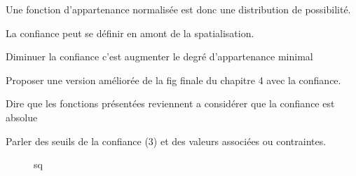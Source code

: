 Une fonction d'appartenance normalisée est donc une distribution de
possibilité.

La confiance peut se définir en amont de la spatialisation.

Diminuer la confiance c'est augmenter le degré d'appartenance minimal

Proposer une version améliorée de la fig finale du chapitre 4 avec la
confiance.

Dire que les fonctions présentées reviennent a considérer que la
confiance est absolue

Parler des seuils de la confiance (3) et des valeurs associées ou
contraintes.


\begin{figure}
  \centering
  
  \caption{sq}
  \label{fig:qs}
\end{figure}




\begin{figure}
  \centering
\end{figure}




